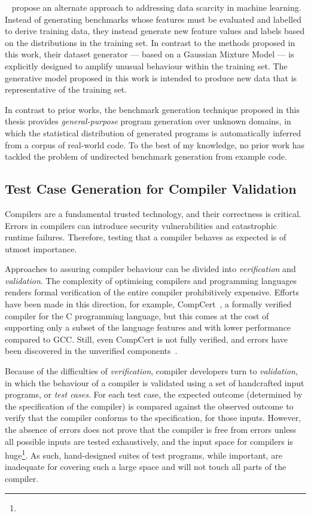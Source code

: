 \citeauthor{Ding2019}~\cite{Ding2019} propose an alternate approach to addressing data scarcity in machine learning. Instead of generating benchmarks whose features must be evaluated and labelled to derive training data, they instead generate new feature values and labels based on the distributions in the training set. In contrast to the methods proposed in this work, their dataset generator --- based on a Gaussian Mixture Model --- is explicitly designed to amplify unusual behaviour within the training set. The generative model proposed in this work is intended to produce new data that is representative of the training set.

In contrast to prior works, the benchmark generation technique proposed in this thesis provides \emph{general-purpose} program generation over unknown domains, in which the statistical distribution of generated programs is automatically inferred from a corpus of real-world code. To the best of my knowledge, no prior work has tackled the problem of undirected benchmark generation from example code.


\subsection{Test Case Generation for Compiler Validation}

Compilers are a fundamental trusted technology, and their correctness is critical. Errors in compilers can introduce security vulnerabilities and catastrophic runtime failures. Therefore, testing that a compiler behaves as expected is of utmost importance.

Approaches to assuring compiler behaviour can be divided into \emph{verification} and \emph{validation}. The complexity of optimising compilers and programming languages renders formal verification of the entire compiler prohibitively expensive. Efforts have been made in this direction, for example, CompCert~\cite{Leroy2013}, a formally verified compiler for the C programming language, but this comes at the cost of supporting only a subset of the language features and with lower performance compared to GCC. Still, even CompCert is not fully verified, and errors have been discovered in the unverified components~\cite{Yang2011}.

Because of the difficulties of \emph{verification}, compiler developers turn to \emph{validation}, in which the behaviour of a compiler is validated using a set of handcrafted input programs, or \emph{test cases}. For each test case, the expected outcome (determined by the specification of the compiler) is compared against the observed outcome to verify that the compiler conforms to the specification, for those inputs. However, the absence of errors does not prove that the compiler is free from errors unless all possible inputs are tested exhaustively, and the input space for compilers is huge\footnote{}. As such, hand-designed suites of test programs, while important, are inadequate for covering such a large space and will not touch all parts of the compiler.

